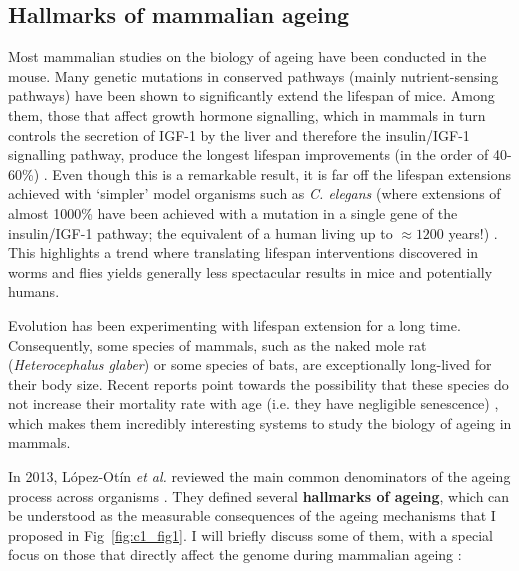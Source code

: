 \smallskip

\subsection{Hallmarks of mammalian ageing} \label{s:1.1.3}

\smallskip

Most mammalian studies on the biology of ageing have been conducted in the mouse. Many genetic mutations in conserved pathways (mainly nutrient-sensing pathways) have been shown to significantly extend the lifespan of mice. Among them, those that affect growth hormone signalling, which in mammals in turn controls the secretion of IGF-1 by the liver and therefore the insulin/IGF-1 signalling pathway, produce the longest lifespan improvements (in the order of 40-60\%) \cite{Singh2019}. Even though this is a remarkable result, it is far off the lifespan extensions achieved with `simpler' model organisms such as \textit{C. elegans} (where extensions of almost 1000\% have been achieved with a mutation in a single gene of the insulin/IGF-1 pathway; the equivalent of a human living up to $\approx 1200$ years!) \cite{Ayyadevara2008}. This highlights a trend where translating lifespan interventions discovered in worms and flies yields generally less spectacular results in mice and potentially humans.

\bigskip

Evolution has been experimenting with lifespan extension for a long time. Consequently, some species of mammals, such as the naked mole rat (\textit{Heterocephalus glaber}) or some species of bats, are exceptionally long-lived for their body size. Recent reports point towards the possibility that these species do not increase their mortality rate with age (i.e. they have negligible senescence) \cite{Ruby2018,Fleischer2017}, which makes them incredibly interesting systems to study the biology of ageing in mammals. 

\bigskip

In 2013, L\'opez-Ot\'in \textit{et al.} reviewed the main common denominators of the ageing process across organisms \cite{Lopez-Otin2013}. They defined several \textbf{hallmarks of ageing}, which can be understood as the measurable consequences of the ageing mechanisms that I proposed in Fig~\ref{fig:c1_fig1}. I will briefly discuss some of them, with a special focus on those that directly affect the genome during mammalian ageing  \cite{Lopez-Otin2013,Singh2019}:

